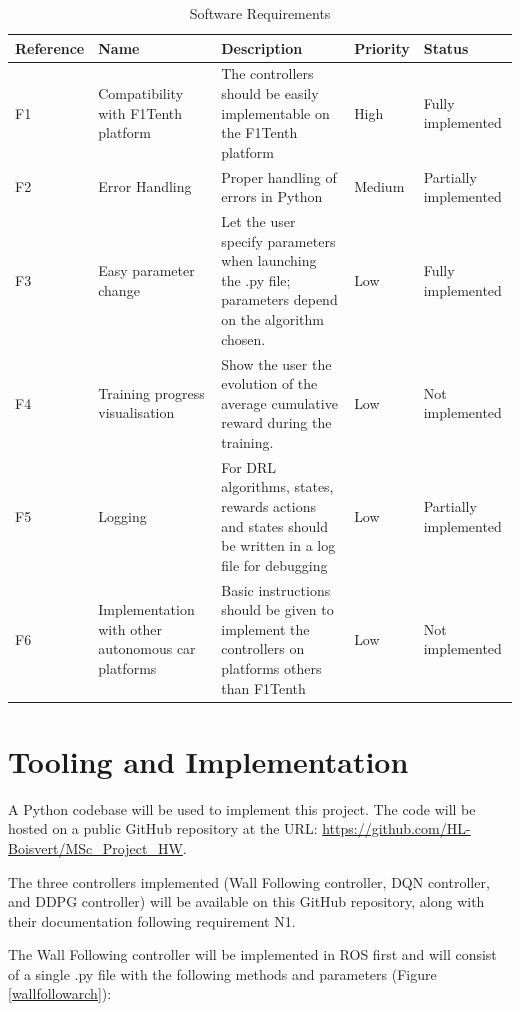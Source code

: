 \begin{table}
\centering
\begin{tabularx}{\textwidth}{||l|X|X|l|X||} 
 \hline
 Reference & Name & Description & Priority & Status\\ [0.5ex] 
 \hline\hline
 F1 & Compatibility with F1Tenth platform & The controllers should be easily implementable on the F1Tenth platform & High & Fully implemented\\
 \hline
 F2 & Error Handling & Proper handling of errors in Python & Medium & Partially implemented\\
 \hline
 F3 & Easy parameter change & Let the user specify parameters when launching the .py file; parameters depend on the algorithm chosen. & Low & Fully implemented \\
 \hline
 F4 & Training progress visualisation & Show the user the evolution of the average cumulative reward during the training. & Low & Not implemented\\
 \hline
 F5 &  Logging & For DRL algorithms, states, rewards actions and states should be written in a log file for debugging & Low & Partially implemented\\
 \hline
 F6 &  Implementation with other autonomous car platforms & Basic instructions should be given to implement the controllers on platforms others than F1Tenth & Low & Not implemented\\ [1ex]
 \hline

\end{tabularx}
\caption{Software Requirements}
\label{sofreqtab}
\end{table}

\section{Tooling and Implementation}
\label{toolimp}

A Python codebase will be used to implement this project. The code will be hosted on a public GitHub repository at the URL: \url{https://github.com/HL-Boisvert/MSc_Project_HW}. \newline

The three controllers implemented (Wall Following controller, DQN controller, and DDPG controller) will be available on this GitHub repository, along with their documentation following requirement N1.

The Wall Following controller will be implemented in ROS first and will consist of a single .py file with the following methods and parameters (Figure \ref{wallfollowarch}):

